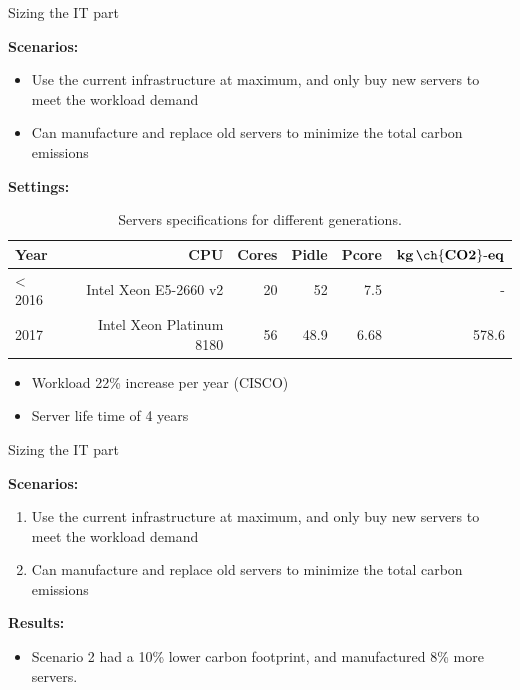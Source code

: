 \documentclass[Ligatures=TeX,table,svgnames,usetotalslideindicator,compress,10pt]{beamer}
\begin{document}
\begin{frame}{Sizing the IT part}


\textbf{Scenarios:}
\begin{itemize}
  \item Use the current infrastructure at maximum, and only buy new servers to meet the workload demand   
  \item Can manufacture and replace old servers to minimize the total carbon emissions    
\end{itemize}

\textbf{Settings:}

\begin{table}[h]
  \small
  \caption{Servers specifications for different generations.} \centering
  \label{tab:servers_specs} 
  \begin{tabular}{|l|r|r|r|r|r|}
  \hline    
  \textbf{Year} & \textbf{CPU} &   \textbf{Cores} & \textbf{Pidle}  & \textbf{Pcore}  & \textbf{$\mathbf{kg\,\ch{CO2}\text{-}eq}$}  \\
  \hline
  < 2016      & Intel Xeon E5-2660 v2 & 20 & 52 & 7.5  & -   \\
  \hline
  2017 & Intel Xeon Platinum 8180 & 56 & 48.9 & 6.68  & 578.6   \\
  \hline
\end{tabular}  
\end{table}



 \begin{itemize}
  \item Workload 22\% increase per year (CISCO)
  \item Server life time of 4 years
  \end{itemize}

\end{frame}



\begin{frame}{Sizing the IT part}
  

\textbf{Scenarios:}
\begin{enumerate}
  \item Use the current infrastructure at maximum, and only buy new servers to meet the workload demand   
  \item Can manufacture and replace old servers to minimize the total carbon emissions    
\end{enumerate}

\textbf{Results:}
\begin{itemize}
  \item Scenario 2 had a 10\% lower carbon footprint, and manufactured
    8\% more servers.
\end{itemize}
  
\end{frame}
\end{document}
